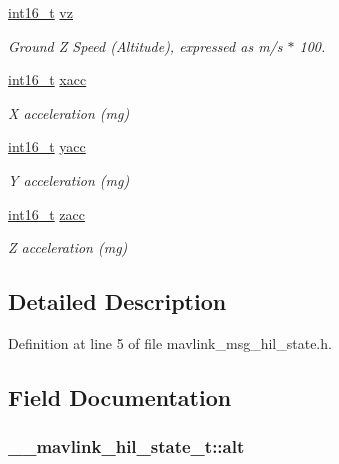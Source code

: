 \begin{DoxyCompactItemize}
\hyperlink{stdint_8h_aa343fa3b3d06292b959ffdd4c4703b06}{int16\-\_\-t} \hyperlink{struct____mavlink__hil__state__t_add6c834de56047ff2316d059b741cce0}{vz}
\begin{DoxyCompactList}\small\item\em Ground Z Speed (Altitude), expressed as m/s $\ast$ 100. \end{DoxyCompactList}\item 
\hyperlink{stdint_8h_aa343fa3b3d06292b959ffdd4c4703b06}{int16\-\_\-t} \hyperlink{struct____mavlink__hil__state__t_a8497c1e566b9acb1d4298090c480a212}{xacc}
\begin{DoxyCompactList}\small\item\em X acceleration (mg) \end{DoxyCompactList}\item 
\hyperlink{stdint_8h_aa343fa3b3d06292b959ffdd4c4703b06}{int16\-\_\-t} \hyperlink{struct____mavlink__hil__state__t_a670623660d6d3d15121b2698082e8f55}{yacc}
\begin{DoxyCompactList}\small\item\em Y acceleration (mg) \end{DoxyCompactList}\item 
\hyperlink{stdint_8h_aa343fa3b3d06292b959ffdd4c4703b06}{int16\-\_\-t} \hyperlink{struct____mavlink__hil__state__t_a79b626e6b13844d733a6a6c02e506b90}{zacc}
\begin{DoxyCompactList}\small\item\em Z acceleration (mg) \end{DoxyCompactList}\end{DoxyCompactItemize}


\subsection{Detailed Description}


Definition at line 5 of file mavlink\-\_\-msg\-\_\-hil\-\_\-state.\-h.



\subsection{Field Documentation}
\hypertarget{struct____mavlink__hil__state__t_a8f4ac2f2f4948df71b4abbb50d7c2f2f}{
\subsubsection[{alt}]{ \-\_\-\-\_\-mavlink\-\_\-hil\-\_\-state\-\_\-t\-::alt}}\label{struct____mavlink__hil__state__t_a8f4ac2f2f4948df71b4abbb50d7c2f2f}


